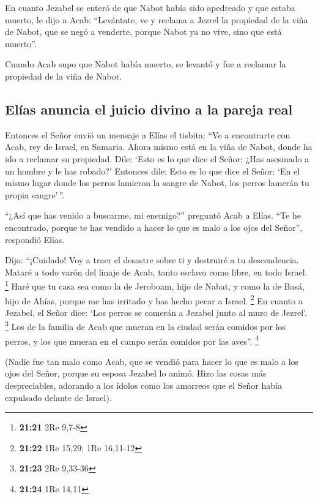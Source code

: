  En cuanto Jezabel se enteró de que Nabot había sido
apedreado y que estaba muerto, le dijo a Acab: ``Levántate, ve y reclama
a Jezrel la propiedad de la viña de Nabot, que se negó a venderte,
porque Nabot ya no vive, sino que está muerto''.

 Cuando Acab supo que Nabot había muerto, se levantó y
fue a reclamar la propiedad de la viña de Nabot.

\hypertarget{eluxedas-anuncia-el-juicio-divino-a-la-pareja-real}{%
\subsection{Elías anuncia el juicio divino a la pareja
real}\label{eluxedas-anuncia-el-juicio-divino-a-la-pareja-real}}

 Entonces el Señor envió un mensaje a Elías el tisbita:
 ``Ve a encontrarte con Acab, rey de Israel, en Samaria.
Ahora mismo está en la viña de Nabot, donde ha ido a reclamar su
propiedad.  Dile: `Esto es lo que dice el Señor: ¿Has
asesinado a un hombre y le has robado?' Entonces dile: Esto es lo que
dice el Señor: `En el mismo lugar donde los perros lamieron la sangre de
Nabot, los perros lamerán tu propia sangre'\,''.

 ``¿Así que has venido a buscarme, mi enemigo?'' preguntó
Acab a Elías. ``Te he encontrado, porque te has vendido a hacer lo que
es malo a los ojos del Señor'', respondió Elías.

 Dijo: ``¡Cuidado! Voy a traer el desastre sobre ti y
destruiré a tu descendencia. Mataré a todo varón del linaje de Acab,
tanto esclavo como libre, en todo Israel. \footnote{\textbf{21:21} 2Re
  9,7-8}  Haré que tu casa sea como la de Jeroboam, hijo
de Nabat, y como la de Basá, hijo de Ahías, porque me has irritado y has
hecho pecar a Israel. \footnote{\textbf{21:22} 1Re 15,29; 1Re 16,11-12}
 En cuanto a Jezabel, el Señor dice: `Los perros se
comerán a Jezabel junto al muro de Jezrel'. \footnote{\textbf{21:23} 2Re
  9,33-36}  Los de la familia de Acab que mueran en la
ciudad serán comidos por los perros, y los que mueran en el campo serán
comidos por las aves''. \footnote{\textbf{21:24} 1Re 14,11}

 (Nadie fue tan malo como Acab, que se vendió para hacer
lo que es malo a los ojos del Señor, porque su esposa Jezabel lo animó.
 Hizo las cosas más despreciables, adorando a los ídolos
como los amorreos que el Señor había expulsado delante de Israel).

